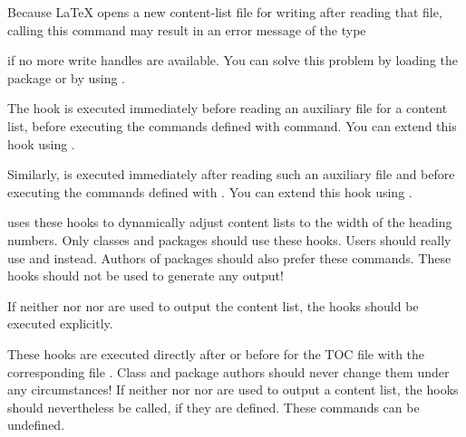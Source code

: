 Because \LaTeX{} opens a new content-list file for
writing after reading that file, calling this command may result in an error
message of the type
if no more write handles are available. You can solve this problem by loading
the 
package \cite{package:scrwfile} or by using \LuaLaTeX{}.%
\EndIndexGroup


\begin{Declaration}
\end{Declaration}
The  hook is executed immediately before reading
an auxiliary file for a content list, before executing the commands defined
with  command. You can extend this
hook using .

Similarly,  is executed immediately after reading
such an auxiliary file and before executing the commands defined with
. You can extend this hook using
.

\KOMAScript{} uses these hooks to dynamically adjust content lists to the
width of the heading numbers. Only classes and packages should use these
hooks. Users should really use
 and
 instead. Authors of packages should
also prefer these commands. These hooks should not be used to generate any
output!

If neither  nor
 nor  are
used to output the content list, the hooks should be executed explicitly.%
\EndIndexGroup


\begin{Declaration}
\end{Declaration}
These hooks are executed directly after
 or before
 for the TOC file with the
corresponding file . Class and package
authors should never change them under any circumstances! If
neither  nor
 nor  are
used to output a content list, the hooks should nevertheless be called, if
they are defined. These commands can be undefined.%
%
\EndIndexGroup


